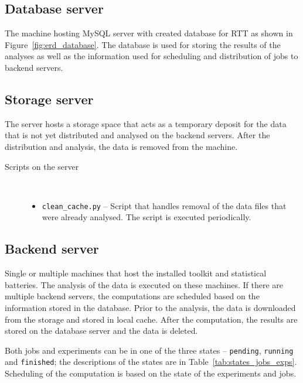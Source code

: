 \documentclass[
  digital,  	%
  color,		%
  oneside,   	%
  12pt,
  nocover,
  notable,
  nolof,
  nolot,
]{fithesis3}
\newenvironment{titlemize}[1]
{
	\begin{description}
	\item[#1]\
	\begin{itemize}
}
{
	\end{itemize}
 	\end{description}
}
\begin{document}
\subsection{Database server}
The machine hosting MySQL server with created database for RTT as shown in Figure~\ref{fig:erd_database}. The database is used for storing the results of the analyses as well as the information used for scheduling and distribution of jobs to backend servers.

\subsection{Storage server}
The server hosts a storage space that acts as a temporary deposit for the data that is not yet distributed and analysed on the backend servers. After the distribution and analysis, the data is removed from the machine.

\begin{titlemize}{Scripts on the server}
\item \texttt{clean\_cache.py} -- Script that handles removal of the data files that were already analysed. The script is executed periodically.
\end{titlemize}

\subsection{Backend server}
Single or multiple machines that host the installed toolkit and statistical batteries. The analysis of the data is executed on these machines. If there are multiple backend servers, the computations are scheduled based on the information stored in the database. Prior to the analysis, the data is downloaded from the storage and stored in local cache. After the computation, the results are stored on the database server and the data is deleted.

Both jobs and experiments can be in one of the three states -- \texttt{pending}, \texttt{running} and \texttt{finished}; the descriptions of the states are in Table~\ref{tab:states_jobs_exps}. Scheduling of the computation is based on the state of the experiments and jobs.
\end{document}
